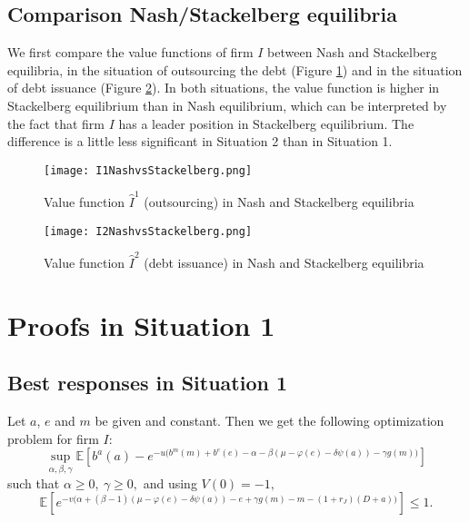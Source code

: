 \documentclass{svjour3}
\begin{document}
\newpage

\subsection{Comparison Nash/Stackelberg equilibria}
We first compare  the value functions  of firm $I$ between Nash and Stackelberg equilibria, in the situation of outsourcing the debt (Figure \ref{fig:I1NashvsStackelberg})
and in the situation of debt issuance (Figure \ref{fig:I2NashvsStackelberg}). In both situations, the value function is higher in Stackelberg equilibrium than in Nash equilibrium, which can be interpreted by the fact that  firm $I$ has a leader position in Stackelberg equilibrium. The difference is a little less significant in Situation 2 than in  Situation 1.

\begin{figure}[ht]
    \centering
    \texttt{[image: I1NashvsStackelberg.png]}
    \caption{Value function $\hat{I}^1$ (outsourcing) in Nash and Stackelberg equilibria}
    \label{fig:I1NashvsStackelberg}
\end{figure}

\begin{figure}[ht]
    \centering
    \texttt{[image: I2NashvsStackelberg.png]}
    \caption{Value function $\hat{I}^2$ (debt issuance) in Nash and Stackelberg equilibria}
    \label{fig:I2NashvsStackelberg}
\end{figure}

\newpage

\section{Proofs in Situation 1}
\label{sec:proof1}

\subsection{Best responses in Situation 1}
\label{sit1}

Let $a$, $e$ and $m$ be given and constant. Then we get the following optimization problem for firm $I$:
$$
\sup_{\alpha,\beta,\gamma}\mathbb{E}\left[b^a(a)
-  e^{-u \big(b^m(m)+b^e(e)-\alpha-\beta(\mu-\varphi(e)-\delta \psi(a))-\gamma g(m) \big) }\right]
$$
such that $\alpha\geq 0,~\gamma\geq 0,$ and using $V(0)=-1,$
\begin{equation}
\label{constr}
\mathbb{E}\left[ e^{-v  \big(\alpha+(\beta-1)(\mu-\varphi(e)-\delta\psi(a))-e+\gamma g(m)-m -(1+r_J)(D+a)\big) }\right]\leq 1.
\end{equation}
\end{document}
